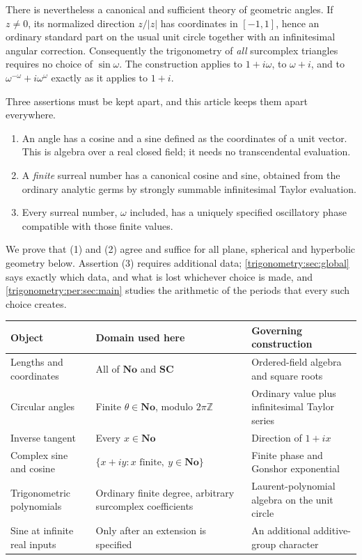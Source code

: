 \documentclass[11pt,letterpaper]{article}
\numberwithin{equation}{section}
\theoremstyle{definition}
\theoremstyle{remark}
\newcommand{\No}{\mathbf{No}}
\newcommand{\SC}{\mathbf{SC}}
\newcommand{\Z}{\mathbb Z}
\begin{document}
There is nevertheless a canonical and sufficient theory of geometric angles. If $z\ne0$, its
normalized direction $z/|z|$ has coordinates in $[-1,1]$, hence an ordinary standard part on the
usual unit circle together with an infinitesimal angular correction. Consequently the trigonometry
of \emph{all} surcomplex triangles requires no choice of $\sin\omega$. The construction applies to
$1+i\omega$, to $\omega+i$, and to $\omega^{-\omega}+i\omega^{\omega}$ exactly as it applies
to $1+i$.

Three assertions must be kept apart, and this article keeps them apart everywhere.
\begin{enumerate}
\item An angle has a cosine and a sine defined as the coordinates of a unit vector. This is
 algebra over a real closed field; it needs no transcendental evaluation.
\item A \emph{finite} surreal number has a canonical cosine and sine, obtained from the ordinary
 analytic germs by strongly summable infinitesimal Taylor evaluation.
\item Every surreal number, $\omega$ included, has a uniquely specified oscillatory phase
 compatible with those finite values.
\end{enumerate}
We prove that (1) and (2) agree and suffice for all plane, spherical and hyperbolic geometry
below. Assertion (3) requires additional data; \cref{trigonometry:sec:global} says exactly which
data, and what is lost whichever choice is made, and \cref{trigonometry:per:sec:main} studies the
arithmetic of the periods that every such choice creates.

\begin{center}
\small
\begin{tabular}{L{0.23\textwidth}L{0.32\textwidth}L{0.35\textwidth}}
\toprule
Object & Domain used here & Governing construction\\
\midrule
Lengths and coordinates & All of $\No$ and $\SC$ & Ordered-field algebra and square roots\\
Circular angles & Finite $\theta\in\No$, modulo $2\pi\Z$ & Ordinary value plus infinitesimal Taylor series\\
Inverse tangent & Every $x\in\No$ & Direction of $1+ix$\\
Complex sine and cosine & $\{x+iy:x\text{ finite},\ y\in\No\}$ & Finite phase and Gonshor exponential\\
Trigonometric polynomials & Ordinary finite degree, arbitrary surcomplex coefficients & Laurent-polynomial algebra on the unit circle\\
Sine at infinite real inputs & Only after an extension is specified & An additional additive-group character\\
\bottomrule
\end{tabular}
\end{center}
\end{document}
